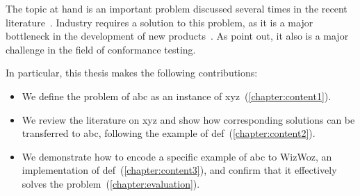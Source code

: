 The topic at hand is an important problem discussed several times in the recent literature~\cite{oakland23-xfl,spmag23-mlmalware,cryptosec11}. Industry requires a solution to this problem, as it is a major bottleneck in the development of new products~\cite{statemerging-patent}. As \citet{conformance-testing-arxiv} point out, it also is a major challenge in the field of conformance testing. 

\lipsum[2-4]

In particular, this thesis makes the following contributions:
\begin{itemize}
    \item We define the problem of abc as an instance of xyz~(\autoref{chapter:content1}).
    \item We review the literature on xyz and show how corresponding solutions can be transferred to abc, following the example of def~(\autoref{chapter:content2}).
    \item We demonstrate how to encode a specific example of abc to WizWoz, an implementation of def~(\autoref{chapter:content3}), and confirm that it effectively solves the problem~(\autoref{chapter:evaluation}).
\end{itemize}

